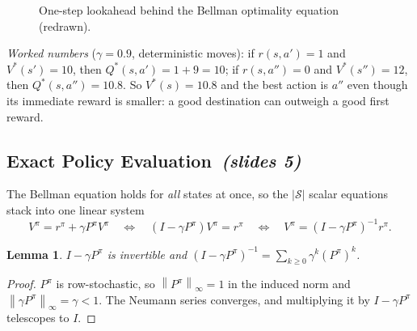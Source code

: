 \documentclass[11pt,a4paper]{article}
\newcommand{\Sset}{\mathcal{S}}
\newcommand{\norm}[1]{\left\lVert #1\right\rVert_\infty}
\newcommand{\sltag}[1]{\texorpdfstring{\ \emph{(slides #1)}}{ (slides #1)}}
\theoremstyle{plain}
\newtheorem{lemma}[theorem]{Lemma}
\theoremstyle{definition}
\theoremstyle{remark}
\begin{document}
\begin{figure}[h]
\centering
{}
\caption{One-step lookahead behind the Bellman optimality equation (redrawn).}
\end{figure}

\begin{intuition}
\emph{Worked numbers} ($\gamma=0.9$, deterministic moves): if $r(s,a')=1$ and $V^*(s')=10$, then $Q^*(s,a')=1+9=10$; if $r(s,a'')=0$ and $V^*(s'')=12$, then $Q^*(s,a'')=10.8$. So $V^*(s)=10.8$ and the best action is $a''$ even though its immediate reward is smaller: a good destination can outweigh a good first reward.
\end{intuition}

\subsection{Exact Policy Evaluation\sltag{5}}
The Bellman equation holds for \emph{all} states at once, so the $|\Sset|$ scalar equations stack into one linear system
\[
V^\pi=r^\pi+\gamma P^\pi V^\pi\quad\Longleftrightarrow\quad (I-\gamma P^\pi)V^\pi=r^\pi\quad\Longleftrightarrow\quad V^\pi=(I-\gamma P^\pi)^{-1}r^\pi .
\]

\begin{lemma}\label{lem:inv}
$I-\gamma P^\pi$ is invertible and $(I-\gamma P^\pi)^{-1}=\sum_{k\ge0}\gamma^k(P^\pi)^k$.
\end{lemma}
\begin{proof}
$P^\pi$ is row-stochastic, so $\norm{P^\pi}=1$ in the induced norm and $\norm{\gamma P^\pi}=\gamma<1$. The Neumann series converges, and multiplying it by $I-\gamma P^\pi$ telescopes to $I$.
\end{proof}
\end{document}
